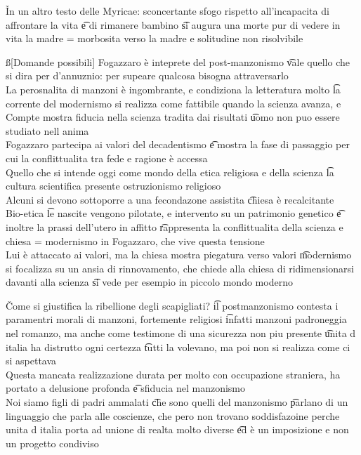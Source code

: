 \documentclass[12pt]{article}
\begin{document}
\v

In un altro testo delle Myricae: sconcertante sfogo rispetto all'incapacita di affrontare la vita \t e di rimanere bambino \t si augura una morte pur di vedere in vita la madre = morbosita verso la madre e solitudine non risolvibile

\ss[Domande possibili]
Fogazzaro è inteprete del post-manzonismo \t vale quello che si dira per d'annuznio: per supeare qualcosa bisogna attraversarlo \\
La perosnalita di manzoni è ingombrante, e condiziona la letteratura molto \t la corrente del modernismo si realizza come fattibile quando la scienza avanza, e Compte mostra fiducia nella scienza tradita dai risultati \t uomo non puo essere studiato nell anima \\
Fogazzaro partecipa ai valori del decadentismo \t e mostra la fase di passaggio per cui la conflittualita tra fede e ragione è accessa \\
Quello che si intende oggi come mondo della etica religiosa e della scienza \t la cultura scientifica presente ostruzionismo religioso \\
Alcuni si devono sottoporre a una fecondazone assistita \t chiesa è recalcitante \\
Bio-etica \t le nascite vengono pilotate, e intervento su un patrimonio genetico \t e inoltre la prassi dell'utero in affitto \t rappresenta la conflittualita della scienza e chiesa = modernismo in Fogazzaro, che vive questa tensione \\
Lui è attaccato ai valori, ma la chiesa mostra piegatura verso valori \t modernismo si focalizza su un ansia di rinnovamento, che chiede alla chiesa di ridimensionarsi davanti alla scienza \t si vede per esempio in piccolo mondo moderno 

\v

Come si giustifica la ribellione degli scapigliati? \t il postmanzonismo contesta i paramentri morali di manzoni, fortemente religiosi \t infatti manzoni padroneggia nel romanzo, ma anche come testimone di una sicurezza non piu presente \t unita d italia ha distrutto ogni certezza \t tutti la volevano, ma poi non si realizza come ci si aspettava \\
Questa mancata realizzazione durata per molto con occupazione straniera, ha portato a delusione profonda \t e sfiducia nel manzonismo \\
Noi siamo figli di padri ammalati \t che sono quelli del manzonismo \t parlano di un linguaggio che parla alle coscienze, che pero non trovano soddisfazoine perche unita d italia porta ad unione di realta molto diverse \t ed è un imposizione e non un progetto condiviso
\end{document}
